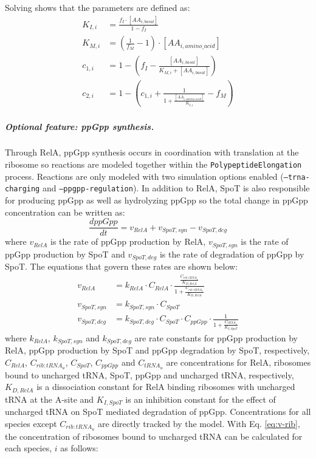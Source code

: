 \documentclass[12pt]{article}
\begin{document}
Solving shows that the parameters are defined as:
\begin{align}
    K_{I,i} &= \frac{f_I\cdot [AA_{i,basal}]}{1 - f_I} \\
    K_{M,i} &= \left(\frac{1}{f_M} - 1\right)\cdot [AA_{i,amino\_acid}] \\
    c_{1,i} &= 1 - \left(f_I - \frac{[AA_{i,basal}]}{K_{M,i} + [AA_{i,basal}]}\right) \\
    c_{2,i} &= 1 - \left(c_{1,i} + \frac{1}{1 + \frac{[AA_{i,amino\_acid}]}{K_{I,i}}} - f_M\right)
\end{align}

\subparagraph{Optional feature: ppGpp synthesis.}
Through RelA, ppGpp synthesis occurs in coordination with translation at the ribosome so reactions are modeled together within the \texttt{PolypeptideElongation} process.  Reactions are only modeled with two simulation options enabled (\texttt{--trna-charging} and \texttt{--ppgpp-regulation}).  In addition to RelA, SpoT is also responsible for producing ppGpp as well as hydrolyzing ppGpp so the total change in ppGpp concentration can be written as:
\begin{equation}
\frac{dppGpp}{dt} = v_{RelA} + v_{SpoT, syn} - v_{SpoT, deg}
\end{equation}
where $v_{RelA}$ is the rate of ppGpp production by RelA, $v_{SpoT, syn}$ is the rate of ppGpp production by SpoT and $v_{SpoT, deg}$ is the rate of degradation of ppGpp by SpoT.  The equations that govern these rates are shown below:
\begin{align}
v_{RelA} &= k_{RelA} \cdot C_{RelA} \cdot \frac{\frac{C_{rib:tRNA_u}}{K_{D, RelA}}}{1 + \frac{C_{rib:tRNA_u}}{K_{D, RelA}}} \\
v_{SpoT, syn} &= k_{SpoT, syn} \cdot C_{SpoT} \\
v_{SpoT, deg} &= k_{SpoT, deg} \cdot C_{SpoT} \cdot C_{ppGpp} \cdot \frac{1}{1 + \frac{C_{tRNA_u}}{K_{I, SpoT}}}
\end{align}
where $k_{RelA}$, $k_{SpoT, syn}$ and $k_{SpoT, deg}$ are rate constants for ppGpp production by RelA, ppGpp production by SpoT and ppGpp degradation by SpoT, respectively, $C_{RelA}$, $C_{rib:tRNA_u}$, $C_{SpoT}$, $C_{ppGpp}$ and $C_{tRNA_u}$ are concentrations for RelA, ribosomes bound to uncharged tRNA, SpoT, ppGpp and uncharged tRNA, respectively, $K_{D, RelA}$ is a dissociation constant for RelA binding ribosomes with uncharged tRNA at the A-site and $K_{I, SpoT}$ is an inhibition constant for the effect of uncharged tRNA on SpoT mediated degradation of ppGpp.  Concentrations for all species except $C_{rib:tRNA_u}$ are directly tracked by the model.  With Eq. \ref{eq:v-rib}, the concentration of ribosomes bound to uncharged tRNA can be calculated for each species, $i$ as follows:
\end{document}
